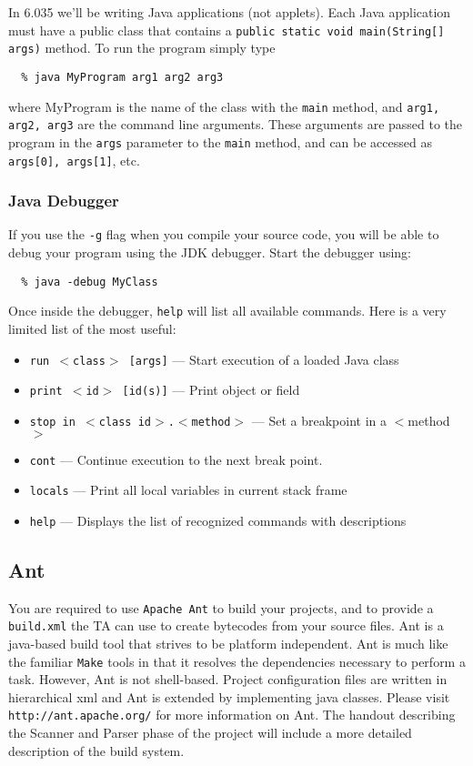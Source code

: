 In 6.035 we'll be writing Java applications (not applets).  Each Java
application must have a public class that contains a {\tt public static
void main(String[] args)} method. To run the program simply type

\begin{verbatim}
  % java MyProgram arg1 arg2 arg3
\end{verbatim}

where MyProgram is the name of the class with the {\tt main} method,
and {\tt arg1, arg2, arg3} are the command line arguments. These
arguments are passed to the program in the {\tt args} parameter to the
{\tt main} method, and can be accessed as {\tt args[0], args[1]}, etc.

\subsubsection*{Java Debugger}

If you use the {\tt -g} flag when you compile your source code, you
will be able to debug your program using the JDK debugger. Start the
debugger using:

\begin{verbatim}
  % java -debug MyClass
\end{verbatim}

Once inside the debugger, {\tt help} will list all available commands.
Here is a very limited list of the most useful:
\begin{itemize}
\item {\tt run $<$class$>$ [args]} --- Start execution of a loaded Java class
\item {\tt print $<$id$>$ [id(s)]} --- Print object or field 
\item {\tt stop in $<$class id$>$.$<$method$>$} --- Set a breakpoint in a $<$method$>$
\item {\tt cont} --- Continue execution to the next break point.
\item {\tt locals} --- Print all local variables in current stack frame
\item {\tt help} --- Displays the list of recognized commands with descriptions 
\end{itemize}

\subsection*{Ant}

You are required to use {\tt Apache Ant} to build your projects, and
to provide a {\tt build.xml} the TA can use to create bytecodes from
your source files.  Ant is a java-based build tool that strives to be
platform independent.  Ant is much like the familiar {\tt Make} tools
in that it resolves the dependencies necessary to perform a task.
However, Ant is not shell-based.  Project configuration files are
written in hierarchical xml and Ant is extended by implementing java
classes.  Please visit {\tt http://ant.apache.org/} for more
information on Ant.  The handout describing the Scanner and Parser
phase of the project will include a more detailed description of the
build system.

